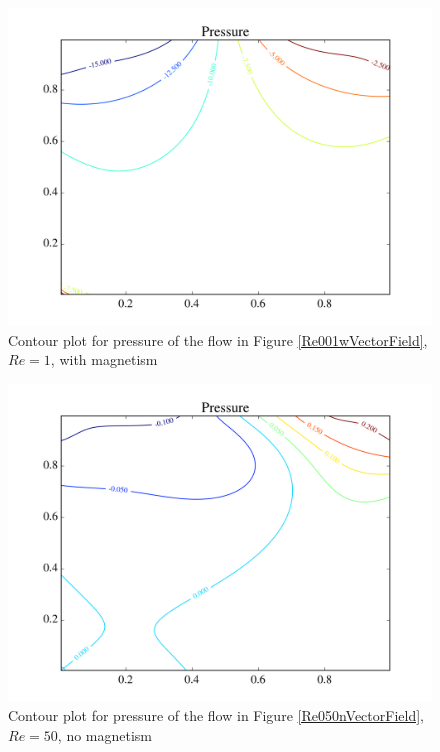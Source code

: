 \documentclass[journal]{IEEEtran}
\begin{document}
\begin{figure}[!t]
\centering
\includegraphics[width=\linewidth]{figures/Re001/w/pressure}
\caption{Contour plot for pressure of the flow in Figure \ref{Re001wVectorField}, $\mathit{Re}=1$, with magnetism\label{Re001wPressure}}
\end{figure}



\begin{figure}[!t]
\centering
\includegraphics[width=\linewidth]{figures/Re050/n/pressure}
\caption{Contour plot for pressure of the flow in Figure \ref{Re050nVectorField}, $\mathit{Re}=50$, no magnetism\label{Re050nPressure}}
\end{figure}
\end{document}
